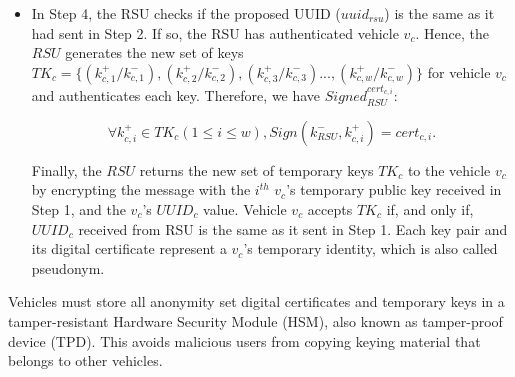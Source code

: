 \documentclass[preprint,12pt]{elsarticle}
\begin{document}
\begin{itemize}
	\item In Step 4, the RSU checks if the proposed UUID ($uuid_{rsu}$) is the same as it had sent in Step 2. If so,  the RSU has authenticated vehicle $v_{c}$. Hence, the $RSU$ generates the new set of keys $TK_{c} = \{ (k^{+}_{c,1}/k^{-}_{c,1}), (k^{+}_{c,2}/k^{-}_{c,2}), (k^{+}_{c,3}/k^{-}_{c,3})..., (k^{+}_{c,w}/k^{-}_{c,w})\}$ for vehicle $v_{c}$ and authenticates each key. Therefore, we have $Signed^{cert_{c,i}}_{RSU}$:
	
	\begin{equation}
\label{eq:etapa22}
	\forall k^{+}_{c,i} \in TK_{c} (1 \le i \le w), Sign(k^{-}_{RSU}, k^{+}_{c,i}) = cert_{c,i}.
\end{equation}

	Finally, the $RSU$ returns the new set of temporary keys  $TK_{c}$ to the vehicle $v_{c}$ by encrypting the message with the $i^{th}$ $v_{c}$'s temporary public key received in Step 1, and the $v_{c}$'s $UUID_c$ value. Vehicle $v_{c}$ accepts $TK_c$ if, and only if, $UUID_c$ received from RSU is the same as it sent in Step 1. Each key pair and its digital certificate represent a $v_{c}$'s temporary identity, which is also called pseudonym.
	
\end{itemize}

Vehicles must store all anonymity set digital certificates and temporary keys in a tamper-resistant Hardware Security Module (HSM), also known as tamper-proof device (TPD). This avoids malicious users from copying keying material that belongs to other vehicles.



\end{document}
